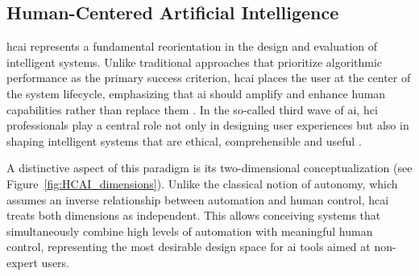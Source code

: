 \documentclass[a4paper,twoside]{article}
\begin{document}
\subsection{Human-Centered Artificial Intelligence}

\Gls{hcai} represents a fundamental reorientation in the design and evaluation of intelligent systems. Unlike traditional approaches that prioritize algorithmic performance as the primary success criterion, \gls{hcai} places the user at the center of the system lifecycle, emphasizing that \gls{ai} should amplify and enhance human capabilities rather than replace them \cite{shneiderman2022human}. In the so-called third wave of \gls{ai}, \gls{hci} professionals play a central role not only in designing user experiences but also in shaping 
intelligent systems that are ethical, comprehensible and useful 
\cite{xu2019toward}.

A distinctive aspect of this paradigm is its two-dimensional conceptualization (see Figure~\ref{fig:HCAI_dimensions}). Unlike the classical notion of autonomy, which assumes an inverse relationship between automation and human control, \gls{hcai} treats both dimensions as independent. This allows conceiving systems that simultaneously combine high levels of automation with meaningful human control, representing the most desirable design space for \gls{ai} tools aimed at non-expert users.
\end{document}

